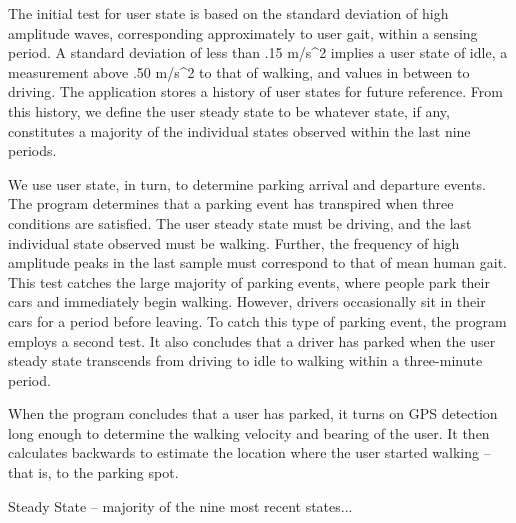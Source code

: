 The initial test for user state is based on the standard deviation of high
amplitude waves, corresponding approximately to user gait, within a sensing
period. A standard deviation of less than .15 m/s^2 implies a user state of
idle, a measurement above .50 m/s^2 to that of walking, and values in between
to driving. The application stores a history of user states for future
reference. From this history, we define the user steady state to be whatever
state, if any, constitutes a majority of the individual states observed
within the last nine periods.

We use user state, in turn, to determine parking arrival and departure
events. The program determines that a parking event has transpired when
three conditions are satisfied. The user steady state must be driving, and
the last individual state observed must be walking. Further, the frequency
of high amplitude peaks in the last sample must correspond to that of mean
human gait. This test catches the large majority of parking events, where
people park their cars and immediately begin walking. However, drivers
occasionally sit in their cars for a period before leaving. To catch this
type of parking event, the program employs a second test. It also concludes
that a driver has parked when the user steady state transcends from driving
to idle to walking within a three-minute period.

When the program concludes that a user has parked, it turns on GPS detection
long enough to determine the walking velocity and bearing of the user. It
then calculates backwards to estimate the location where the user started
walking – that is, to the parking spot.

Steady State – majority of the nine most recent states...
